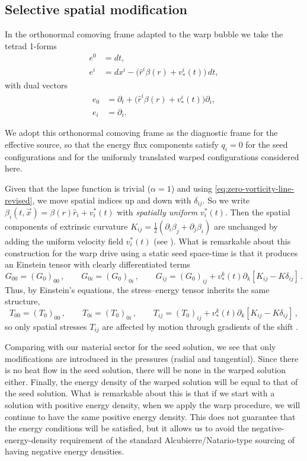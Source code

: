 \documentclass[11pt]{article}
\begin{document}
\subsection{Selective spatial modification}
In the orthonormal comoving frame adapted to the warp bubble we take the tetrad 1-forms
\begin{align}
e^0 &= dt, \\
e^i &= dx^i - \bigl(\hat{r}^i\beta(r) + v^i_*(t)\bigr)\,dt,
\end{align}
with dual vectors
\begin{align}
e_0 &= \partial_t + \bigl(\hat{r}^i\beta(r) + v^i_*(t)\bigr)\partial_i, \\
e_i &= \partial_i.
\end{align}

We adopt this orthonormal comoving frame as the diagnostic frame for the effective source, so that the energy flux components satisfy $q_i=0$ for the seed configurations and for the uniformly translated warped configurations considered here.

Given that the lapse function is trivial ($\alpha=1$) and using \eqref{eq:zero-vorticity-line-revised}, we move spatial indices up and down with $\delta_{ij}$. So we write $\beta_i(t,\vec x)=\beta(r)\hat r_i+v^*_i(t)$ with \emph{spatially uniform} $v^*_i(t)$. Then the spatial components of extrinsic curvature $K_{ij}=\tfrac12(\partial_i\beta_j+\partial_j\beta_i)$ are unchanged by adding the uniform velocity field $v^*_i(t)$ (see \cite{Schuster:2023ADMmass}). What is remarkable about this construction for the warp drive using a static seed space-time is that it produces an Einstein tensor with clearly differentiated terms
\begin{equation}
G_{00}=(G_0)_{00}\,,\qquad G_{0i}=(G_0)_{0i}\,, \qquad
G_{ij}= (G_{0})_{ij} + v^{k}_{*}(t)  \partial_{k}[K_{ij}-K\delta_{ij}]
\,.
\end{equation}
Thus, by Einstein's equations, the stress--energy tensor inherits the same structure,
\begin{equation}
T_{00}=(T_0)_{00}\,,\qquad T_{0i}=(T_0)_{0i}\,, \qquad
T_{ij}= (T_{0})_{ij} + v^{k}_{*}(t)  \partial_{k}[K_{ij}-K\delta_{ij}]\,,
\label{eq:Tij-motion}
\end{equation}
so only spatial stresses $T_{ij}$ are affected by motion through gradients of the shift
\cite{Santiago:2021aup,Schuster:2023ADMmass}.

Comparing with our material sector for the seed solution, we see that only modifications are introduced in the pressures (radial and tangential). Since there is no heat flow in the seed solution, there will be none in the warped solution either. Finally, the energy density of the warped solution will be equal to that of the seed solution. What is remarkable about this is that if we start with a solution with positive energy density, when we apply the warp procedure, we will continue to have the same positive energy density. This does not guarantee that the energy conditions will be satisfied, but it allows us to avoid the negative-energy-density requirement of the standard Alcubierre/Natario-type sourcing of having negative energy densities.
\end{document}
